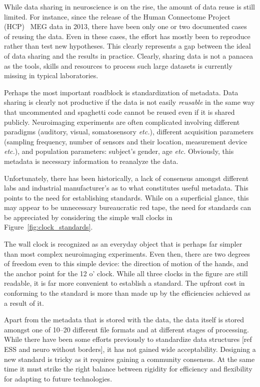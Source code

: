 While data sharing in neuroscience is on the rise, the amount of data reuse is still limited. For instance, since the release of the Human Connectome Project (HCP)~\citep{larson2013adding} MEG data in 2013, there have been only one or two documented cases~\citep{jas2017autoreject} of reusing the data. Even in these cases, the effort has mostly been to reproduce rather than test new hypotheses. This clearly represents a gap between the ideal of data sharing and the results in practice. Clearly, sharing data is not a panacea as the tools, skills and resources to process such large datasets is currently missing in typical laboratories. 

Perhaps the most important roadblock is standardization of metadata. Data sharing is clearly not productive if the data is not easily  \emph{reusable} in the same way that uncommented and spaghetti code cannot be reused even if it is shared publicly. Neuroimaging experiments are often complicated involving different paradigms (auditory, visual, somatosensory \emph{etc.}), different acquisition parameters (sampling frequency, number of sensors and their location, measurement device \emph{etc.}), and population parameters: subject's gender, age \emph{etc.} Obviously, this metadata is necessary information to reanalyze the data.   

Unfortunately, there has been historically, a lack of consensus amongst different labs and industrial manufacturer's as to what constitutes useful metadata. This points to the need for establishing standards. While on a superficial glance, this may appear to be unnecessary bureaucratic red tape, the need for standards can be appreciated by considering the simple wall clocks in Figure~\ref{fig:clock_standards}.

The wall clock is recognized as an everyday object that is perhaps far simpler than most complex neuroimaging experiments. Even then, there are two degrees of freedom even to this simple device: the direction of motion of the hands, and the anchor point for the 12 o' clock. While all three clocks in the figure are still readable, it is far more convenient to establish a standard. The upfront cost in conforming to the standard is more than made up by the efficiencies achieved as a result of it.

Apart from the metadata that is stored with the data, the data itself is stored amongst one of 10--20 different file formats and at different stages of processing. While there have been some efforts previously to standardize data structures [ref ESS and neuro without borders], it has not gained wide acceptability. Designing a new standard is tricky as it requires gaining a community consensus. At the same time it must strike the right balance between rigidity for efficiency and flexibility for adapting to future technologies. 

